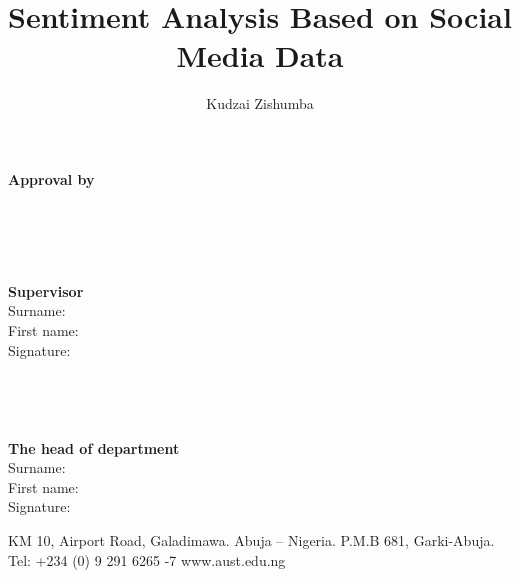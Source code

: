 \documentclass[final,a4paper]{aust_thesis}
\begin{document}

\title{%
Sentiment Analysis Based on Social Media Data
}
\author{%
Kudzai Zishumba
}



\maketitle



\begin{figure}[h]
  \centering
\end{figure}



\begin{center}
\large\textbf{Approval by}
\end{center}
\leavevmode\\
\leavevmode\\
\leavevmode\\
\leavevmode\\
\noindent
\textbf{Supervisor}\\
Surname:\\
First name:\\
Signature:\\
\\
\\
\\
\\
\noindent
\textbf{The head of department}\\
Surname:\\
First name:\\
Signature:\\


\vspace*{\fill}
\begingroup
\begin{center}
\tiny KM 10, Airport Road, Galadimawa. Abuja – Nigeria. P.M.B 681, Garki-Abuja. Tel: +234 (0) 9 291 6265 -7
www.aust.edu.ng
\end{center}
\endgroup
\end{document}
